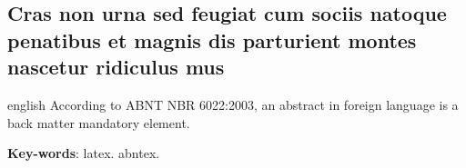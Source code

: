 \documentclass[
	article,			%
	11pt,				%
	oneside,			%
	a4paper,			%
	english,			%
	brazil,				%
	]{abntex2}
\begin{document}
\begin{anexosenv}

\chapter{Cras non urna sed feugiat cum sociis natoque penatibus et magnis dis
parturient montes nascetur ridiculus mus}

\lipsum[31]

\end{anexosenv}




\emptythanks
\maketitle

\renewcommand{\resumoname}{Abstract}
\begin{resumoumacoluna}
 \begin{otherlanguage*}{english}
   According to ABNT NBR 6022:2003, an abstract in foreign language is a back
   matter mandatory element.

   \vspace{\onelineskip}
 
   \noindent
   \textbf{Key-words}: latex. abntex.
 \end{otherlanguage*}  
\end{resumoumacoluna}
 
\end{document}
